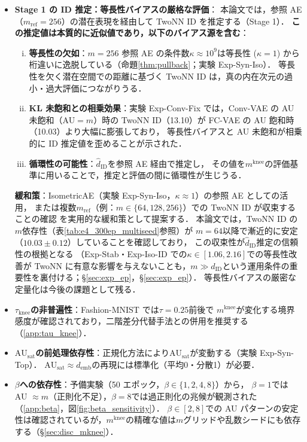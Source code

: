 \documentclass[11pt,a4paper]{jsarticle}
\newcommand{\kap}{\kappa}
\newcommand{\AUsat}{\mathrm{AU}_{\mathrm{sat}}}
\newcommand{\mknee}{m^{\mathrm{knee}}}
\newcommand{\demb}{d_{\mathrm{emb}}}
\begin{document}
\begin{itemize}
  \item \textbf{Stage 1 の ID 推定：等長性バイアスの厳格な評価}：
        本論文では，参照 AE（$m_\mathrm{ref}=256$）の潜在表現を経由して TwoNN ID を推定する（Stage 1）．
        \textbf{この推定値は本質的に近似値であり，以下のバイアス源を含む}：
        \begin{enumerate}[(i)]
          \item \textbf{等長性の欠如}：$m=256$ 参照 AE の条件数$\kap \approx 10^9$は等長性
                ($\kap=1$) から桁違いに逸脱している（命題\ref{thm:pullback}；実験 Exp-Syn-Iso）．
                等長性を欠く潜在空間での距離に基づく TwoNN ID は，真の内在次元の過小・過大評価につながりうる．
          \item \textbf{KL 未飽和との相乗効果}：実験 Exp-Conv-Fix では，Conv-VAE の AU 未飽和（AU$=m$）時の
                TwoNN ID（13.10）が FC-VAE の AU 飽和時（10.03）より大幅に膨張しており，
                等長性バイアスと AU 未飽和が相乗的に ID 推定値を歪めることが示された．
          \item \textbf{循環性の可能性}：$\hat{d}_\mathrm{ID}$を参照 AE 経由で推定し，
                その値を$\mknee$の評価基準に用いることで，推定と評価の間に循環性が生じうる．
        \end{enumerate}
        \textbf{緩和策}：IsometricAE（実験 Exp-Syn-Iso，$\kap \approx 1$）の参照 AE としての活用，
        または複数$m_\mathrm{ref}$（例：$m \in \{64, 128, 256\}$）での TwoNN ID が収束することの確認
        を実用的な緩和策として提案する．
        本論文では，TwoNN ID の$m$依存性（表\ref{tab:e4_300ep_multiseed}参照）が
        $m=64$以降で漸近的に安定（$10.03 \pm 0.12$）していることを確認しており，
        この収束性が$\hat{d}_\mathrm{ID}$推定の信頼性の根拠となる
        （Exp-Stab・Exp-Iso-ID での$\kap \in [1.06, 2.16]$での等長性改善が TwoNN に有意な影響を与えないことも，$m \gg d_\mathrm{ID}$という運用条件の重要性を裏付ける；§\ref{sec:exp_ep}，§\ref{sec:exp_ep}）．
        等長性バイアスの厳密な定量化は今後の課題として残る．
  \item \textbf{$\tau_{\mathrm{knee}}$の非普遍性}：Fashion-MNIST では$\tau = 0.25$前後で
        $\mknee$が変化する境界感度が確認されており，二階差分代替手法との併用を推奨する
        （\ref{app:tau_knee}）．
  \item \textbf{$\AUsat$の前処理依存性}：正規化方法により$\AUsat$が変動する（実験 Exp-Syn-Top）．
        $\AUsat \approx \demb$の再現には標準化（平均0・分散1）が必要．
  \item \textbf{$\beta$への依存性}：予備実験（50 エポック，$\beta \in \{1,2,4,8\}$）から，
        $\beta = 1$では AU $\approx m$（正則化不足），$\beta = 8$では過正則化の兆候が観測された
        （\ref{app:beta}，図\ref{fig:beta_sensitivity}）．
        $\beta \in [2, 8]$での AU パターンの安定性は確認されているが，$\mknee$の精確な値は$m$グリッドや乱数シードにも依存する（§\ref{sec:disc_mknee}）．
\end{itemize}
\end{document}
